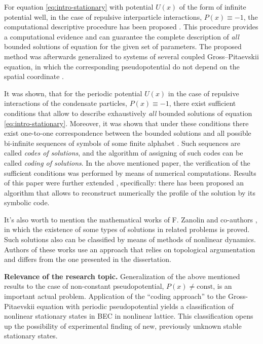 For equation \eqref{eq:intro-stationary} with potential $U(x)$ of the form of infinite potential well, in the case of repulsive interparticle interactions, $P(x) \equiv -1$, the computational descriptive procedure has been proposed \cite{AlfimovZezyulin}.
This procedure provides a computational evidence and can guarantee the complete description of {\it all} bounded solutions of equation for the given set of parameters.
The proposed method was afterwards generalized to systems of several coupled Gross--Pitaevskii equation, in which the corresponding pseudopotential do not depend on the spatial coordinate \cite{AlfimovBarashenkovFedotovSmirnovZezyulin}.

It was shown, that for the periodic potential $U(x)$ in the case of repulsive interactions of the condensate particles, $P(x) \equiv -1$, there exist sufficient conditions that allow to describe exhaustively {\it all} bounded solutions of equation \eqref{eq:intro-stationary}.
Moreover, it was shown that under these conditions there exist one-to-one correspondence between the bounded solutions and all possible bi-infinite sequences of symbols of some finite alphabet \cite{AlfimovAvramenko}.
Such sequences are called {\it codes of solutions}, and the algorithm of assigning of such codes can be called {\it coding of solutions}.
In the above mentioned paper, the verification of the sufficient conditions was performed by means of numerical computations.
Results of this paper were further extended \cite{AlfimovKizinZezyulin}, specifically: there has been proposed an algorithm that allows to reconstruct numerically the profile of the solution by its symbolic code.

It's also worth to mention the mathematical works of F. Zanolin and co-authors \cite{ZaniniZanolin2018, ZaniniZanolin2012}, in which the existence of some types of solutions in related problems is proved.
Such solutions also can be classified by means of methods of nonlinear dynamics.
Authors of these works use an approach that relies on topological argumentation and differs from the one presented in the dissertation.

\textbf{Relevance of the research topic.}
Generalization of the above mentioned results to the case of non-constant pseudopotential, $P(x) \neq \mathrm{const}$, is an important actual problem.
Application of the ``coding approach'' to the Gross-Pitaevskii equation with periodic pseudopotential yields  a classification of nonlinear stationary states in BEC in nonlinear lattice.
This classification opens up the possibility of experimental finding of new, previously unknown stable stationary states.

